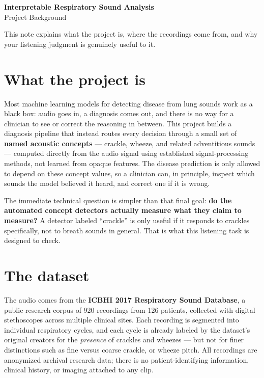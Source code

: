\documentclass[11pt]{article}
\begin{document}
\begin{center}
{\LARGE\bfseries Interpretable Respiratory Sound Analysis}\\[2pt]
{\normalsize Project Background}
\end{center}

\vspace{2pt}
\noindent This note explains what the project is, where the recordings come from, and why your
listening judgment is genuinely useful to it.

\section*{What the project is}
Most machine learning models for detecting disease from lung sounds work as a black box: audio
goes in, a diagnosis comes out, and there is no way for a clinician to see or correct the
reasoning in between. This project builds a diagnosis pipeline that instead routes every decision
through a small set of \textbf{named acoustic concepts} --- crackle, wheeze, and related
adventitious sounds --- computed directly from the audio signal using established signal-processing
methods, not learned from opaque features. The disease prediction is only allowed to depend on
these concept values, so a clinician can, in principle, inspect which sounds the model believed it
heard, and correct one if it is wrong.

The immediate technical question is simpler than that final goal: \textbf{do the automated
concept detectors actually measure what they claim to measure?} A detector labeled ``crackle''
is only useful if it responds to crackles specifically, not to breath sounds in general. That is
what this listening task is designed to check.

\section*{The dataset}
The audio comes from the \textbf{ICBHI 2017 Respiratory Sound Database}, a public research corpus
of 920 recordings from 126 patients, collected with digital stethoscopes across multiple clinical
sites. Each recording is segmented into individual respiratory cycles, and each cycle is already
labeled by the dataset's original creators for the \emph{presence} of crackles and wheezes --- but
not for finer distinctions such as fine versus coarse crackle, or wheeze pitch. All recordings are
anonymized archival research data; there is no patient-identifying information, clinical history,
or imaging attached to any clip.
\end{document}
